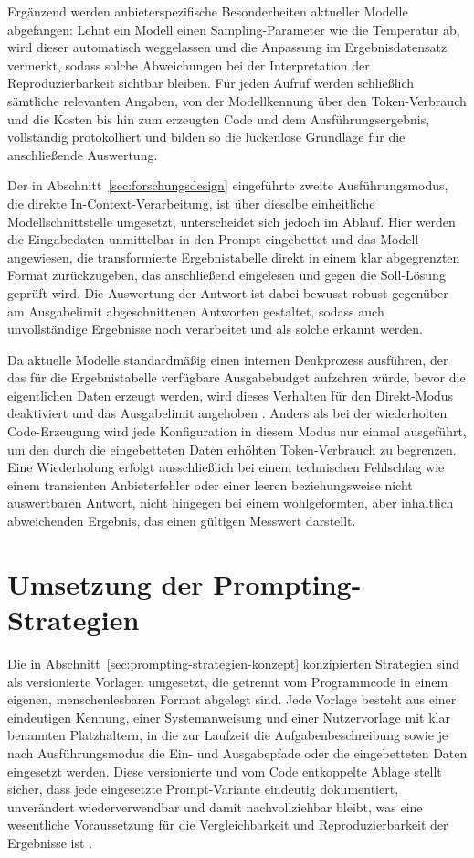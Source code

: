 Ergänzend werden anbieterspezifische Besonderheiten aktueller Modelle abgefangen: Lehnt ein Modell einen Sampling-Parameter wie die Temperatur ab, wird dieser automatisch weggelassen und die Anpassung im Ergebnisdatensatz vermerkt, sodass solche Abweichungen bei der Interpretation der Reproduzierbarkeit sichtbar bleiben. Für jeden Aufruf werden schließlich sämtliche relevanten Angaben, von der Modellkennung über den Token-Verbrauch und die Kosten bis hin zum erzeugten Code und dem Ausführungsergebnis, vollständig protokolliert und bilden so die lückenlose Grundlage für die anschließende Auswertung.

Der in Abschnitt~\ref{sec:forschungsdesign} eingeführte zweite Ausführungsmodus, die direkte In-Context-Verarbeitung, ist über dieselbe einheitliche Modellschnittstelle umgesetzt, unterscheidet sich jedoch im Ablauf. Hier werden die Eingabedaten unmittelbar in den Prompt eingebettet und das Modell angewiesen, die transformierte Ergebnistabelle direkt in einem klar abgegrenzten Format zurückzugeben, das anschließend eingelesen und gegen die Soll-Lösung geprüft wird. Die Auswertung der Antwort ist dabei bewusst robust gegenüber am Ausgabelimit abgeschnittenen Antworten gestaltet, sodass auch unvollständige Ergebnisse noch verarbeitet und als solche erkannt werden.

Da aktuelle Modelle standardmäßig einen internen Denkprozess ausführen, der das für die Ergebnistabelle verfügbare Ausgabebudget aufzehren würde, bevor die eigentlichen Daten erzeugt werden, wird dieses Verhalten für den Direkt-Modus deaktiviert und das Ausgabelimit angehoben \autocite{changEfficientPromptingMethods2024}. Anders als bei der wiederholten Code-Erzeugung wird jede Konfiguration in diesem Modus nur einmal ausgeführt, um den durch die eingebetteten Daten erhöhten Token-Verbrauch zu begrenzen. Eine Wiederholung erfolgt ausschließlich bei einem technischen Fehlschlag wie einem transienten Anbieterfehler oder einer leeren beziehungsweise nicht auswertbaren Antwort, nicht hingegen bei einem wohlgeformten, aber inhaltlich abweichenden Ergebnis, das einen gültigen Messwert darstellt.

\section{Umsetzung der Prompting-Strategien}
\label{sec:prompting-umsetzung}

Die in Abschnitt~\ref{sec:prompting-strategien-konzept} konzipierten Strategien sind als versionierte Vorlagen umgesetzt, die getrennt vom Programmcode in einem eigenen, menschenlesbaren Format abgelegt sind. Jede Vorlage besteht aus einer eindeutigen Kennung, einer Systemanweisung und einer Nutzervorlage mit klar benannten Platzhaltern, in die zur Laufzeit die Aufgabenbeschreibung sowie je nach Ausführungsmodus die Ein- und Ausgabepfade oder die eingebetteten Daten eingesetzt werden. Diese versionierte und vom Code entkoppelte Ablage stellt sicher, dass jede eingesetzte Prompt-Variante eindeutig dokumentiert, unverändert wiederverwendbar und damit nachvollziehbar bleibt, was eine wesentliche Voraussetzung für die Vergleichbarkeit und Reproduzierbarkeit der Ergebnisse ist \autocite{schulhoffPromptReportSystematic2025,changEfficientPromptingMethods2024}.

